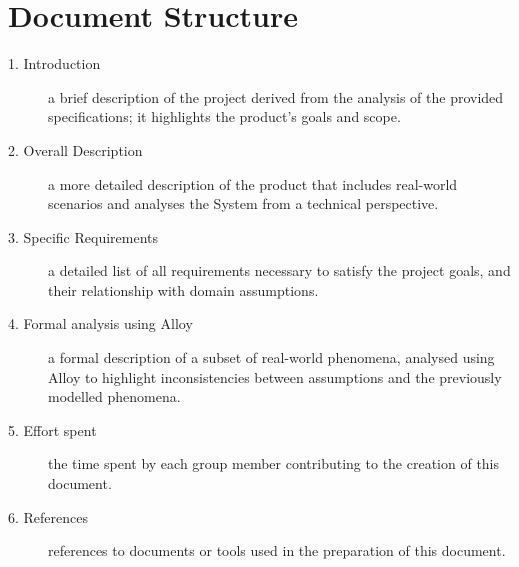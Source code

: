 \section{Document Structure}
\begin{description}
    \item [1. Introduction] a brief description of the project derived from the analysis of the provided specifications; it highlights the product's goals and scope.
    \item [2. Overall Description] a more detailed description of the product that includes real-world scenarios and analyses the System from a technical perspective.
    \item [3. Specific Requirements] a detailed list of all requirements necessary to satisfy the project goals, and their relationship with domain assumptions.
    \item [4. Formal analysis using Alloy] a formal description of a subset of real-world phenomena, analysed using Alloy to highlight inconsistencies between assumptions and the previously modelled phenomena.
    \item [5. Effort spent] the time spent by each group member contributing to the creation of this document.
    \item [6. References] references to documents or tools used in the preparation of this document.
\end{description}
